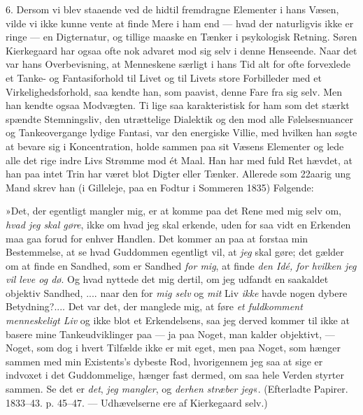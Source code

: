 \documentclass[12pt,a4paper,openany]{book}
\newcommand{\opage}[1]{\marginnote{\footnotesize\textit{[#1]}}}
\begin{document}
\opage{44}6. Dersom vi blev staaende ved de hidtil fremdragne
Elementer i hans Væsen, vilde vi ikke kunne
vente at finde Mere i ham end --- hvad der naturligvis
ikke er ringe --- en Digternatur, og tillige maaske en
Tænker i psykologisk Retning. Søren Kierkegaard har
ogsaa ofte nok advaret mod sig selv i denne Henseende.
Naar det var hans Overbevisning, at Menneskene
særligt i hans Tid alt for ofte forvexlede et Tanke-
og Fantasiforhold til Livet og til Livets store Forbilleder
med et Virkelighedsforhold, saa kendte han, som paavist,
denne Fare fra sig selv. Men han kendte ogsaa Modvægten.
Ti lige saa karakteristisk for ham som det
stærkt spændte Stemningsliv, den utrættelige Dialektik
og den mod alle Følelsesnuancer og Tankeovergange
lydige Fantasi, var den energiske Villie, med hvilken
han søgte at bevare sig i Koncentration, holde sammen
paa sit Væsens Elementer og lede alle det rige indre
Livs Strømme mod ét Maal. Han har med fuld Ret
hævdet, at han paa intet Trin har været blot Digter
eller Tænker. Allerede som 22aarig ung Mand skrev
han (i Gilleleje, paa en Fodtur i Sommeren 1835) Følgende:

»Det, der egentligt mangler mig, er at komme paa
det Rene med mig selv om, \textit{hvad jeg skal gøre}, ikke om
hvad jeg skal erkende, uden for saa vidt en Erkenden
maa gaa forud for enhver Handlen. Det kommer an paa
at forstaa min Bestemmelse, at se hvad Guddommen
egentligt vil, at \textit{jeg} skal gøre; det gælder om at finde en
Sandhed, som er Sandhed \textit{for mig}, at finde \textit{den Idé, for
hvilken jeg vil leve og dø}. Og hvad nyttede det mig dertil,
om jeg udfandt en saakaldet objektiv Sandhed, ....
naar den for \textit{mig selv} og \textit{mit} Liv \textit{ikke} havde nogen
dybere Betydning?.... Det var det, der manglede mig,
at føre \textit{et fuldkomment menneskeligt Liv} og ikke blot et
\opage{45}Erkendelsens, saa jeg derved kommer til ikke at basere
mine Tankeudviklinger paa --- ja paa Noget, man kalder
objektivt, --- Noget, som dog i hvert Tilfælde ikke er
mit eget, men paa Noget, som hænger sammen med min
Existents's dybeste Rod, hvorigennem jeg saa at sige er
indvoxet i det Guddommelige, hænger fast dermed, om
saa hele Verden styrter sammen. Se det er \textit{det}, \textit{jeg
mangler}, og \textit{derhen stræber jeg}«. (Efterladte Papirer.
1833--43. p. 45--47. --- Udhævelserne ere af Kierkegaard
selv.)
\end{document}
